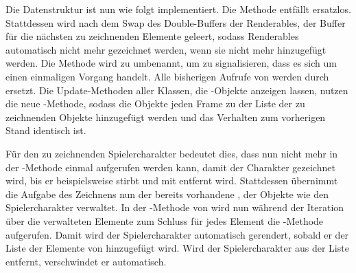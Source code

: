 Die Datenstruktur ist nun wie folgt implementiert. Die Methode  entfällt ersatzlos. Stattdessen wird nach dem Swap des Double-Buffers der Renderables, der Buffer für die nächsten zu zeichnenden Elemente geleert, sodass Renderables automatisch nicht mehr gezeichnet werden, wenn sie nicht mehr hinzugefügt werden. Die Methode  wird zu  umbenannt, um zu signalisieren, dass es sich um einen einmaligen Vorgang handelt. Alle bisherigen Aufrufe von  werden durch  ersetzt. Die Update-Methoden aller Klassen, die -Objekte anzeigen lassen, nutzen die neue -Methode, sodass die Objekte jeden Frame zu der Liste der zu zeichnenden Objekte hinzugefügt werden und das Verhalten zum vorherigen Stand identisch ist.

\begin{leftrule}
	Für den zu zeichnenden Spielercharakter bedeutet dies, dass nun nicht mehr in der -Methode einmal  aufgerufen werden kann, damit der Charakter gezeichnet wird, bis er beispielsweise stirbt und mit  entfernt wird. Stattdessen übernimmt die Aufgabe des Zeichnens nun der bereits vorhandene , der Objekte wie den Spielercharakter verwaltet. In der -Methode von  wird nun während der Iteration über die verwalteten Elemente zum Schluss für jedes Element die -Methode aufgerufen. Damit wird der Spielercharakter automatisch gerendert, sobald er der Liste der Elemente von  hinzugefügt wird. Wird der Spielercharakter aus der Liste entfernt, verschwindet er automatisch.
\end{leftrule}

